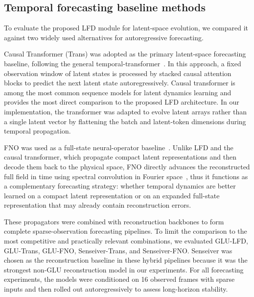 \documentclass[pdflatex,sn-nature]{sn-jnl}%
\begin{document}
\subsection*{Temporal forecasting baseline methods}
\label{subsec: Temporal_Baseline}
To evaluate the proposed LFD module for latent-space evolution, we compared it against two widely used alternatives for autoregressive forecasting.

Causal Transformer (Trans) was adopted as the primary latent-space forecasting baseline, following the general temporal-transformer~\cite{SoleraRico2024}. 
In this approach, a fixed observation window of latent states is processed by stacked causal attention blocks to predict the next latent state autoregressively. 
Causal transformer is among the most common sequence models for latent dynamics learning and provides the most direct comparison to the proposed LFD architecture.
In our implementation, the transformer was adapted to evolve latent arrays rather than a single latent vector by flattening the batch and latent-token dimensions during temporal propagation. 

FNO was used as a full-state neural-operator baseline~\cite{li2021fourier}. 
Unlike LFD and the causal transformer, which propagate compact latent representations and then decode them back to the physical space, FNO directly advances the reconstructed full field in time using spectral convolution in Fourier space~\cite{Fu2025NO}, thus it functions as a complementary forecasting strategy: whether temporal dynamics are better learned on a compact latent representation or on an expanded full-state representation that may already contain reconstruction errors.

These propagators were combined with reconstruction backbones to form complete sparse-observation forecasting pipelines. 
To limit the comparison to the most competitive and practically relevant combinations, we evaluated GLU-LFD, GLU-Trans, GLU-FNO, Senseiver-Trans, and Senseiver-FNO. 
Senseiver was chosen as the reconstruction baseline in these hybrid pipelines because it was the strongest non-GLU reconstruction model in our experiments.
For all forecasting experiments, the models were conditioned on 16 observed frames with sparse inputs and then rolled out autoregressively to assess long-horizon stability.

\end{document}
